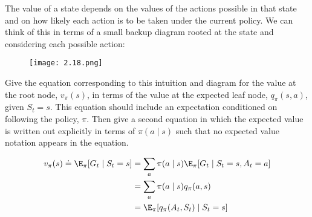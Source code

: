 
\begin{exercise}[Exercise 3.18]

The value of a state depends on the values of the actions possible in that state and on how likely each action is to be taken under the current policy.
We can think of this in terms of a small backup diagram rooted at the state and considering each possible action:

\begin{figure}[H]
    \centering
    \texttt{[image: 2.18.png]}
    \caption{}
    \label{fig:2.18}
\end{figure}

Give the equation corresponding to this intuition and diagram for the value at the root node, $v_\pi(s)$, in terms of the value at the expected leaf node, $q_\pi(s, a)$, given $S_t = s$.
This equation should include an expectation conditioned on following the policy, $\pi$.
Then give a second equation in which the expected value is written out explicitly in terms of $\pi(a \mid s)$ such that no expected value notation appears in the equation.

\end{exercise}


\begin{solution}

\begin{align*}
    v_\pi(s)
    \doteq
    \E_\pi[G_t \mid S_t = s]
    & =
    \sum_a
        \pi(a \mid s)
        \E_\pi[G_t \mid S_t = s, A_t = a] \\
    & =
    \sum_a
        \pi(a \mid s)
        q_\pi(a, s) \\
    & =
    \E_\pi[q_\pi(A_t, S_t) \mid S_t = s]
\end{align*}

\end{solution}

